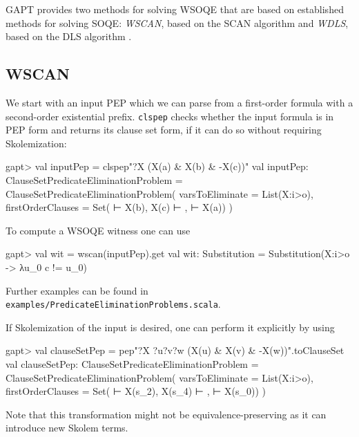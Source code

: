 \documentclass[a4paper,11pt]{book}
\begin{document}
GAPT provides two methods for solving WSOQE that are based on established methods for solving SOQE: \emph{WSCAN}, based on the SCAN algorithm \cite{Gabbay1992Quantifier} and \emph{WDLS}, based on the DLS algorithm \cite{Doherty1997Computing}.

\subsection{WSCAN}

We start with an input PEP which we can parse from a first-order formula with a second-order existential prefix. \texttt{clspep} checks whether the input formula is in PEP form and returns its clause set form, if it can do so without requiring Skolemization:
\begin{clilisting}
gapt> val inputPep = clspep"?X (X(a) & X(b) & -X(c))"
val inputPep: ClauseSetPredicateEliminationProblem = ClauseSetPredicateEliminationProblem(
  varsToEliminate = List(X:i>o),
  firstOrderClauses = Set( ⊢ X(b), X(c) ⊢ ,  ⊢ X(a))
)

\end{clilisting}

To compute a WSOQE witness one can use
\begin{clilisting}
gapt> val wit = wscan(inputPep).get
val wit: Substitution = Substitution(X:i>o -> λu_0 c != u_0)

\end{clilisting}

Further examples can be found in \texttt{examples/PredicateEliminationProblems.scala}.

If Skolemization of the input is desired, one can perform it explicitly by using
\begin{clilisting}
gapt> val clauseSetPep = pep"?X ?u?v?w (X(u) & X(v) & -X(w))".toClauseSet
val clauseSetPep: ClauseSetPredicateEliminationProblem = ClauseSetPredicateEliminationProblem(
  varsToEliminate = List(X:i>o),
  firstOrderClauses = Set( ⊢ X(s_2), X(s_4) ⊢ ,  ⊢ X(s_0))
)

\end{clilisting}
Note that this transformation might not be equivalence-preserving as it can introduce new Skolem terms.
\end{document}
